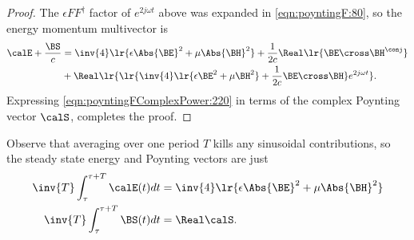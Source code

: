 \begin{proof}
The \( \epsilon F F^\dagger \) factor of \( e^{2 j \omega t} \) above was expanded in \cref{eqn:poyntingF:80}, so the energy momentum multivector is
\begin{equation}\label{eqn:poyntingFComplexPower:220}
\begin{aligned}
\calE + \frac{\BS}{c}
&=
\inv{4} \lr{
\epsilon \Abs{\BE}^2 + \mu \Abs{\BH}^2 }
+
\frac{1}{2 c} \Real \lr{
\BE \cross \BH^\conj
} \\
&+
\Real
\lr{
   \lr{
     \inv{4} \lr{ \epsilon \BE^2 + \mu \BH^2 }
   + \frac{1}{2 c} \BE \cross \BH
   }
   e^{2 j \omega t }
}.
\end{aligned}
\end{equation}
Expressing \cref{eqn:poyntingFComplexPower:220} in terms
of the complex Poynting vector \( \calS \), completes the proof.
\end{proof}

Observe that
averaging over one period \( T \) kills any sinusoidal contributions, so the steady state energy and Poynting vectors are just
\begin{equation}\label{eqn:poyntingFComplexPower:280}
\begin{aligned}
\inv{T} \int_\tau^{\tau+T} \calE(t) dt &=
\inv{4} \lr{
\epsilon \Abs{\BE}^2 + \mu \Abs{\BH}^2 } \\
\inv{T} \int_\tau^{\tau+T} \BS(t) dt &= \Real \calS.
\end{aligned}
\end{equation}

